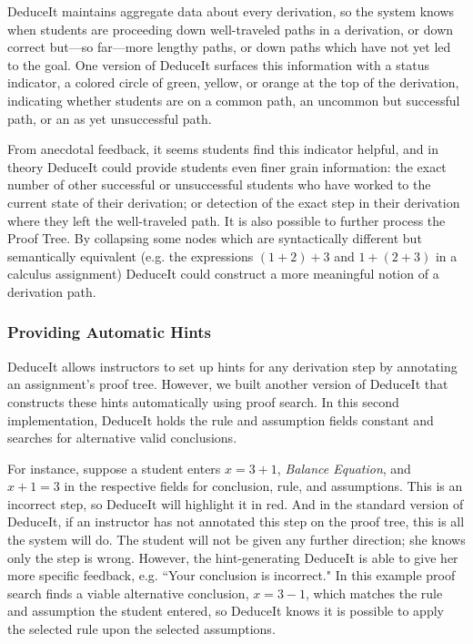 \documentclass{sigchi}
\begin{document}
DeduceIt maintains aggregate data about every derivation, so the system knows when students are proceeding down well-traveled paths in a derivation, or down correct but---so far---more lengthy paths, or down paths which have not yet led to the goal. One version of DeduceIt surfaces this information with a status indicator, a colored circle of green, yellow, or orange at the top of the derivation, indicating whether students are on a common path, an uncommon but successful path, or an as yet unsuccessful path. 

From anecdotal feedback, it seems students find this indicator helpful, and in theory DeduceIt could provide students even finer grain information: the exact number of other successful or unsuccessful students who have worked to the current state of their derivation; or detection of the exact step in their derivation where they left the well-traveled path. It is also possible to further process the Proof Tree. By collapsing some nodes which are syntactically different but semantically equivalent (e.g. the expressions $(1+2)+3$ and $1+(2+3)$ in a calculus assignment) DeduceIt could construct a more meaningful notion of a derivation path.

\subsubsection{Providing Automatic Hints}

DeduceIt allows instructors to set up hints for any derivation step by annotating an assignment's proof tree. However, we built another version of DeduceIt that constructs these hints automatically using proof search. In this second implementation, DeduceIt holds the rule and assumption fields constant and searches for alternative valid conclusions. 

For instance, suppose a student enters $x=3+1$, \textit{Balance Equation}, and $x+1=3$ in the respective fields for conclusion, rule, and assumptions. This is an incorrect step, so DeduceIt will highlight it in red. And in the standard version of DeduceIt, if an instructor has not annotated this step on the proof tree, this is all the system will do. The student will not be given any further direction; she knows only the step is wrong. However, the hint-generating DeduceIt is able to give her more specific feedback, e.g. ``Your conclusion is incorrect." In this example proof search finds a viable alternative conclusion, $x=3-1$, which matches the rule and assumption the student entered, so DeduceIt knows it is possible to apply the selected rule upon the selected assumptions.
\end{document}
